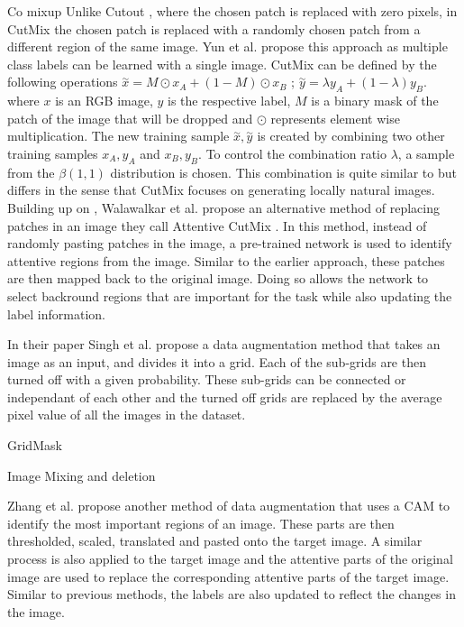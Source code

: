 Co mixup
Unlike Cutout \cite{devriesImprovedRegularizationConvolutional2017}, where the chosen patch is replaced with zero pixels, in CutMix \cite{yunCutMixRegularizationStrategy2019} the chosen patch is replaced with a randomly chosen patch from a different region of the same image. Yun et al. propose this approach as multiple class labels can be learned with a single image.
CutMix can be defined by the following operations $\overset{\sim}x = M \odot x_{A} + (1-M) \odot x_{B}$ ; $\overset{\sim}y = \lambda y_{A}+ (1- \lambda)y_{B}$. where $x$ is an RGB image, $y$ is the respective label, $M$ is a binary mask of the patch of the image that will be dropped and $\odot$ represents element wise multiplication. The new training sample $\overset{\sim}x , \overset{\sim}y$ is created by combining two other training samples $x_{A}, y_{A}$ and $x_{B} , y_{B}$. To control the combination ratio $\lambda$, a sample from the $\beta(1,1)$ distribution is chosen. This combination is quite similar to \cite{zhangMixupEmpiricalRisk2018} but differs in the sense that CutMix focuses on generating locally natural images.
Building up on \cite{yunCutMixRegularizationStrategy2019}, Walawalkar et al. propose an alternative method of replacing patches in an image they call Attentive CutMix \cite{walawalkarAttentiveCutMixEnhanced2020}. In this method, instead of randomly pasting patches in the image, a pre-trained network is used to identify attentive regions from the image. Similar to the earlier approach, these patches are then mapped back to the original image. Doing so allows the network to select backround regions that are important for the task while also updating the label information. 

In their paper Singh et al. \cite{singhHideandSeekDataAugmentation2018} propose a data augmentation method that takes an image as an input, and divides it into a grid. Each of the sub-grids are then turned off with a given probability. These sub-grids can be connected or independant of each other and the turned off grids are replaced by the average pixel value of all the images in the dataset.

GridMask

Image Mixing and deletion

Zhang et al. propose another method of data augmentation that uses a CAM \cite{zhouLearningDeepFeatures2016} to identify the most important regions of an image. These parts are then thresholded, scaled, translated and pasted onto the target image. A similar process is also applied to the target image and the attentive parts of the original image are used to replace the corresponding attentive parts of the target image. Similar to previous methods, the labels are also updated to reflect the changes in the image.

